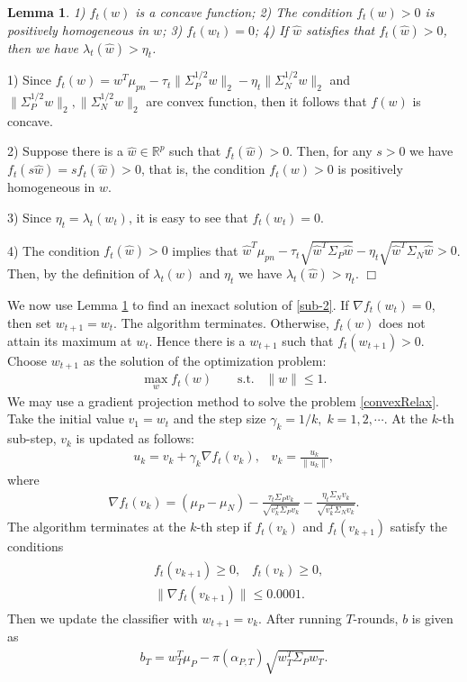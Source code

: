 \documentclass[15pt]{article}
\newcommand{\R}{{\mathbb R}}
\newcommand{\be}{\begin{eqnarray}}
\newcommand{\ben}{\begin{eqnarray*}}
\newcommand{\en}{\end{eqnarray}}
\newcommand{\enn}{\end{eqnarray*}}
\newtheorem{lemma}{Lemma}
\newenvironment{proof}{{\em Proof.}}{$\Box$}
\begin{document}
\begin{lemma}\label{f}
1) $f_t(w)$ is a concave function; 2) The condition $f_t(w)>0$ is positively homogeneous in $w$;
3) $f_t(w_t)=0$; 4) If $\hat w$ satisfies that $f_t(\hat w)>0$, then we have $\lambda_{t}(\hat w)>\eta_t$.
\end{lemma}

\begin{proof}
1) Since $f_{t}(w)=w^T\mu_{pn}-\tau_t\|\Sigma_P^{1/2}w\|_2-\eta_{t}\|\Sigma_N^{1/2}w\|_2$
and $\|\Sigma_P^{1/2}w\|_2,\|\Sigma_N^{1/2}w\|_2$ are convex function,
then it follows that $f(w)$ is concave.

2) Suppose there is a $\hat w\in\R^p$ such that $f_t(\hat w)>0$.
Then, for any $s>0$ we have $f_t(s\hat w)=sf_t(\hat w)>0$, that is,
the condition $f_t(w)>0$ is positively homogeneous in $w$.

3) Since $\eta_{t}=\lambda_{t}(w_{t})$, it is easy to see that $f_t(w_t)=0$.

4) The condition $f_t(\hat w)>0$ implies that
$\hat w^T\mu_{pn}-\tau_t\sqrt{\hat w^T\Sigma_P\hat w}-\eta_{t}\sqrt{\hat w^T\Sigma_N\hat w}>0$.
Then, by the definition of $\lambda_t(w)$ and $\eta_t$ we have $\lambda_{t}(\hat w)>\eta_t$.
\end{proof}

We now use Lemma \ref{f} to find an inexact solution of \eqref{sub-2}.
If $\nabla f_t(w_t)= 0$, then set $w_{t+1} = w_t$. The algorithm terminates.
Otherwise, $f_t(w)$ does not attain its maximum at $w_t$. Hence there is a $w_{t+1}$ such that
$f_t(w_{t+1})>0$. Choose $w_{t+1}$ as the solution of the optimization problem:
\be\label{convexRelax}
\max_{w} f_t(w)\qquad \text{s.t.}\;\;\;\|w\|\le 1.
\en
We may use a gradient projection method to solve the problem \eqref{convexRelax}.
Take the initial value $v_1=w_{t}$ and the step size $\gamma_k= 1/k,\;k=1,2,\cdots$.
At the $k$-th sub-step, $v_k$ is updated as follows:
\ben
u_k=v_k+\gamma_k\nabla f_{t}(v_k),\;\;\; v_k=\frac{u_k}{\|u_k\|},
\enn
where
\ben
\nabla f_{t}(v_k)=(\mu_P-\mu_N)-\frac{\tau_t\Sigma_P v_k}{\sqrt{v_k^T\Sigma_P v_k}}
-\frac{\eta_t\Sigma_N v_k}{\sqrt{v_k^T\Sigma_N v_k}}.
\enn
The algorithm terminates at the $k$-th step if $f_t(v_k)$ and $f_t(v_{k+1})$ satisfy the conditions
\begin{align}\label{terminated-condition}
\begin{split}
&f_t(v_{k+1}) \ge 0,\;\;\;f_t(v_k) \ge 0,\\
&\|\nabla f_t(v_{k+1})\| \le 0.0001.
\end{split}
\end{align}
Then we update the classifier with $w_{t+1}=v_k$. After running $T$-rounds, $b$ is given as
\be\label{b}
b_T=w_T^T\mu_P-\pi(\alpha_{P,T})\sqrt{w_T^T\Sigma_P w_T}.
\en
\end{document}
